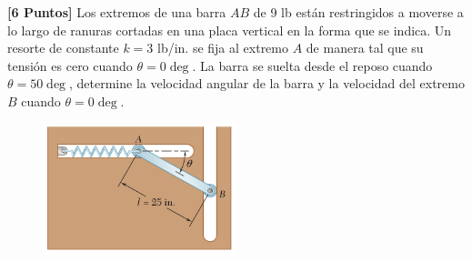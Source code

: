 \documentclass[ a4paper, twoside, 11pt]{article}
\begin{document}
\begin{problem}
\textbf{[6 Puntos]} Los extremos de una barra $AB$ de 9 lb est\'an restringidos a moverse a lo largo de ranuras cortadas en una placa vertical en la forma que se indica. Un resorte de constante $k = 3$ lb/in. se fija al extremo $A$ de manera tal que su tensi\'on es cero cuando $\theta = 0\deg$. La barra se suelta desde el reposo cuando $\theta = 50\deg$, determine la velocidad angular de la barra y la velocidad del extremo $B$ cuando $\theta = 0\deg$. 

\begin{figure}[htb]
\centering
\includegraphics[width=0.5\textwidth]{problema-03.jpg}
\end{figure}


\end{problem}
\end{document}
